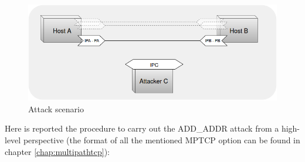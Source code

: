 \begin{figure}[!htb]
\centering
\includegraphics[width=\textwidth]{images/Attack1}
\caption{Attack scenario}
\label{fig:attack1}
\end{figure}

Here is reported the procedure to carry out the ADD\_ADDR attack from a high-level perspective (the format of all the mentioned MPTCP option can be found in chapter \ref{chap:multipathtcp}):


